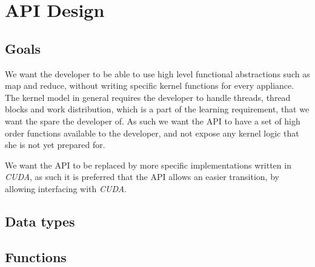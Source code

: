 \section{API Design}
\subsection{Goals}
We want the developer to be able to use high level functional abstractions such as map and reduce, without writing specific kernel functions for every appliance. The kernel model in general requires the developer to handle threads, thread blocks and work distribution, which is a part of the learning requirement, that we want the spare the developer of.
As such we want the API to have a set of high order functions available to the developer, and not expose any kernel logic that she is not yet prepared for.

We want the API to be replaced by more specific implementations written in \textit{CUDA}, as such it is preferred that the API allows an easier transition, by allowing interfacing with \textit{CUDA}.

\subsection{Data types}

\subsection{Functions}
